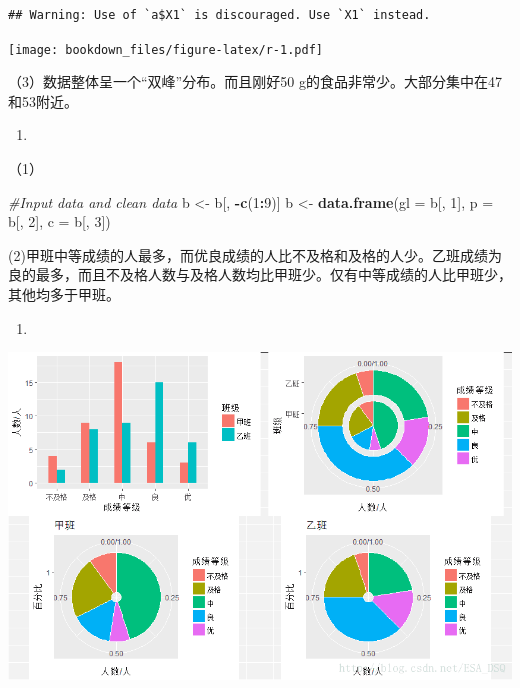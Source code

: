 \documentclass[]{ctexbook}
\newenvironment{Shaded}{\begin{snugshade}}{\end{snugshade}}
\newcommand{\CommentTok}[1]{\textcolor[rgb]{0.56,0.35,0.01}{\textit{#1}}}
\newcommand{\DataTypeTok}[1]{\textcolor[rgb]{0.13,0.29,0.53}{#1}}
\newcommand{\DecValTok}[1]{\textcolor[rgb]{0.00,0.00,0.81}{#1}}
\newcommand{\KeywordTok}[1]{\textcolor[rgb]{0.13,0.29,0.53}{\textbf{#1}}}
\newcommand{\NormalTok}[1]{#1}
\newcommand{\OperatorTok}[1]{\textcolor[rgb]{0.81,0.36,0.00}{\textbf{#1}}}
\newcommand{\StringTok}[1]{\textcolor[rgb]{0.31,0.60,0.02}{#1}}
\begin{document}
\begin{verbatim}
## Warning: Use of `a$X1` is discouraged. Use `X1` instead.
\end{verbatim}

\texttt{[image: bookdown\_files/figure-latex/r-1.pdf]}

（3）数据整体呈一个``双峰''分布。而且刚好50 g的食品非常少。大部分集中在47和53附近。

\begin{enumerate}
\def\labelenumi{\arabic{enumi}.}
\setcounter{enumi}{1}
\item
\end{enumerate}

（1）

\begin{Shaded}
\begin{Highlighting}[]
\CommentTok{#Input data and clean data}
\NormalTok{b <-}\StringTok{ }\NormalTok{b[, }\OperatorTok{-}\KeywordTok{c}\NormalTok{(}\DecValTok{1}\OperatorTok{:}\DecValTok{9}\NormalTok{)]}
\NormalTok{b <-}\StringTok{ }\KeywordTok{data.frame}\NormalTok{(}\DataTypeTok{gl =}\NormalTok{ b[, }\DecValTok{1}\NormalTok{], }\DataTypeTok{p =}\NormalTok{ b[, }\DecValTok{2}\NormalTok{], }\DataTypeTok{c =}\NormalTok{ b[, }\DecValTok{3}\NormalTok{])}
\end{Highlighting}
\end{Shaded}

(2)甲班中等成绩的人最多，而优良成绩的人比不及格和及格的人少。乙班成绩为良的最多，而且不及格人数与及格人数均比甲班少。仅有中等成绩的人比甲班少，其他均多于甲班。

\begin{enumerate}
\def\labelenumi{(\arabic{enumi})}
\setcounter{enumi}{2}
\item
\end{enumerate}

\includegraphics[width=1\linewidth,height=0.45\textheight]{fig/fig42}
\end{document}
